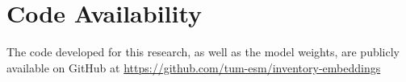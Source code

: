 





\chapter{Code Availability}
The code developed for this research, as well as the model weights, are publicly available on GitHub at \url{https://github.com/tum-esm/inventory-embeddings}